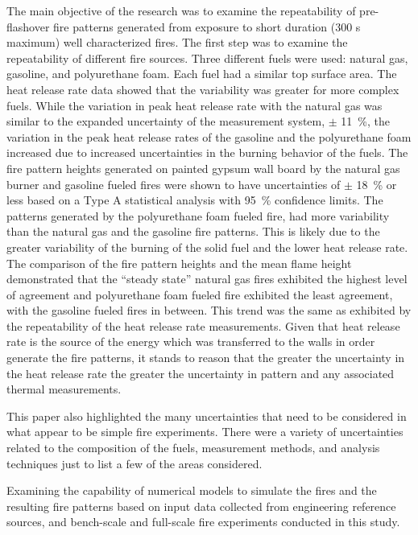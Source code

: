 \documentclass[twoside]{uocthesis}
\begin{document}
{The main objective of the research was to examine the repeatability of pre-flashover fire patterns generated from exposure to short duration (300 s maximum) well characterized fires.  The first step was to examine the repeatability of different fire sources.  Three different fuels were used: natural gas, gasoline, and polyurethane foam.  Each fuel had a similar top surface area.  The heat release rate data showed that the variability was greater for more complex fuels.  While the variation in peak heat release rate with the natural gas was similar to the expanded uncertainty of the measurement system, $\pm$ 11~\%, the variation in the peak heat release rates of the gasoline and the polyurethane foam increased due to increased uncertainties in the burning behavior of the fuels.  The fire pattern heights generated on painted gypsum wall board by the natural gas burner and gasoline fueled fires were shown to have uncertainties of $\pm$ 18~\% or less based on a Type A statistical analysis with 95~\% confidence limits. The patterns generated by the polyurethane foam fueled fire, had more variability than the natural gas and the gasoline fire patterns.  This is likely due to the greater variability of the burning of the solid fuel and the lower heat release rate.    The comparison of the fire pattern heights and the mean flame height demonstrated that the “steady state” natural gas fires exhibited the highest level of agreement and polyurethane foam fueled fire exhibited the least agreement, with the gasoline fueled fires in between.  This trend was the same as exhibited by the repeatability of the heat release rate measurements.  Given that heat release rate is the source of the energy which was transferred to the walls in order generate the fire patterns, it stands to reason that the greater the uncertainty in the heat release rate the greater the uncertainty in pattern and any associated thermal measurements.  

This paper also highlighted the many uncertainties that need to be considered in what appear to be simple fire experiments. There were a variety of uncertainties related to the composition of the fuels, measurement methods, and analysis techniques just to list a few of the areas considered. 

Examining the capability of numerical models to simulate the fires and the resulting fire patterns based on input data collected from engineering reference sources, and bench-scale and full-scale fire experiments conducted in this study.

}
\end{document}
